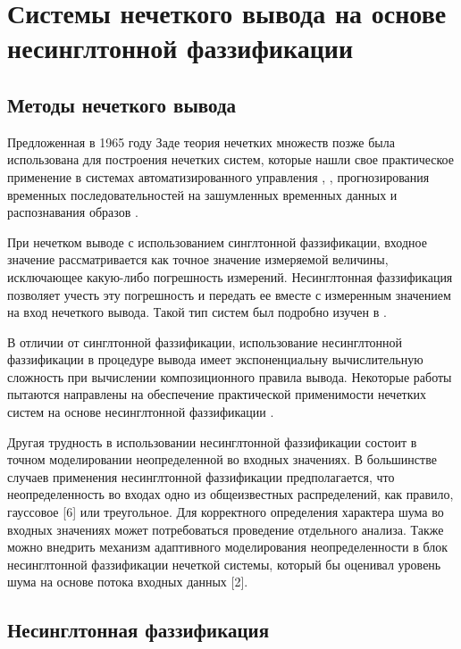 \chapter{Системы нечеткого вывода на основе несинглтонной фаззификации}\label{ch:ch1}

\section{Методы нечеткого вывода}

Предложенная в 1965 году Заде теория нечетких множеств \cite{zadeh1965} позже была использована для построения нечетких систем, которые нашли свое практическое применение в системах автоматизированного управления \cite{mamdani1975}, \cite{Lee1990}, прогнозирования временных последовательностей на зашумленных временных данных \cite{} и распознавания образов \cite{}.

При нечетком выводе с использованием синглтонной фаззификации, входное значение рассматривается как точное значение измеряемой величины, исключающее какую-либо погрешность измерений. Несинглтонная фаззификация позволяет учесть эту погрешность и передать ее вместе с измеренным значением на вход нечеткого вывода. Такой тип систем был подробно изучен в \cite{mendel}.

В отличии от синглтонной фаззификации, использование несинглтонной фаззификации в процедуре вывода имеет экспоненциальну вычислительную сложность при вычислении композиционного правила вывода. Некоторые работы пытаются направлены на обеспечение практической применимости нечетких систем на основе несинглтонной фаззификации \cite{liang}.

Другая трудность в использовании несинглтонной фаззификации состоит в точном моделировании неопределенной во входных значениях. В большинстве случаев применения несинглтонной фаззификации предполагается, что неопределенность во входах одно из общеизвестных распределений, как правило, гауссовое [6] или треугольное. Для корректного определения характера шума во входных значениях может потребоваться проведение отдельного анализа. Также можно внедрить механизм адаптивного моделирования неопределенности в блок несинглтонной фаззификации нечеткой системы, который бы оценивал уровень шума на основе потока входных данных [2].

\section{Несинглтонная фаззификация}



